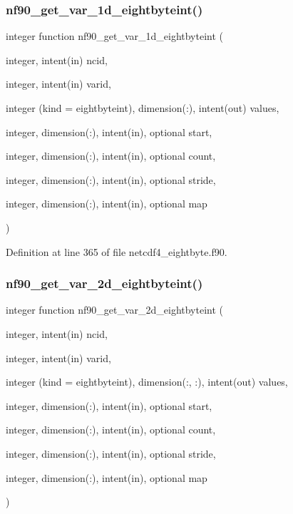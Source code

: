 \subsubsection{\texorpdfstring{nf90\+\_\+get\+\_\+var\+\_\+1d\+\_\+eightbyteint()}{nf90\_get\_var\_1d\_eightbyteint()}}
{\footnotesize\ttfamily integer function nf90\+\_\+get\+\_\+var\+\_\+1d\+\_\+eightbyteint (\begin{DoxyParamCaption}\item[{integer, intent(in)}]{ncid,  }\item[{integer, intent(in)}]{varid,  }\item[{integer (kind = eightbyteint), dimension(\+:), intent(out)}]{values,  }\item[{integer, dimension(\+:), intent(in), optional}]{start,  }\item[{integer, dimension(\+:), intent(in), optional}]{count,  }\item[{integer, dimension(\+:), intent(in), optional}]{stride,  }\item[{integer, dimension(\+:), intent(in), optional}]{map }\end{DoxyParamCaption})}



Definition at line 365 of file netcdf4\+\_\+eightbyte.\+f90.

\mbox{\label{netcdf4__eightbyte_8f90_ac52730b7beb0dfd1e6350756edbd2168}} 
\subsubsection{\texorpdfstring{nf90\+\_\+get\+\_\+var\+\_\+2d\+\_\+eightbyteint()}{nf90\_get\_var\_2d\_eightbyteint()}}
{\footnotesize\ttfamily integer function nf90\+\_\+get\+\_\+var\+\_\+2d\+\_\+eightbyteint (\begin{DoxyParamCaption}\item[{integer, intent(in)}]{ncid,  }\item[{integer, intent(in)}]{varid,  }\item[{integer (kind = eightbyteint), dimension(\+:, \+:), intent(out)}]{values,  }\item[{integer, dimension(\+:), intent(in), optional}]{start,  }\item[{integer, dimension(\+:), intent(in), optional}]{count,  }\item[{integer, dimension(\+:), intent(in), optional}]{stride,  }\item[{integer, dimension(\+:), intent(in), optional}]{map }\end{DoxyParamCaption})}



